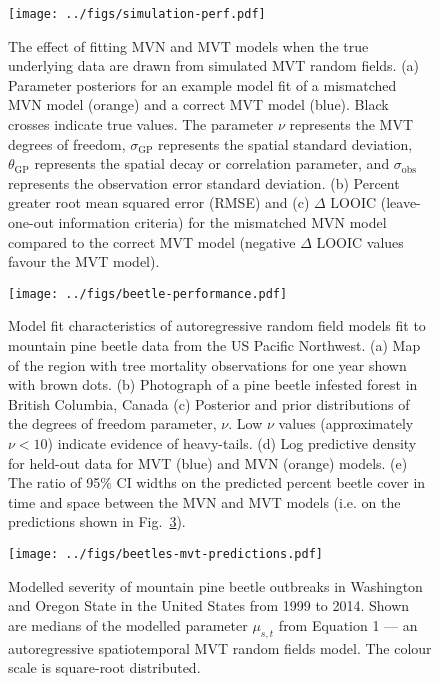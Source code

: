 \documentclass[12pt,english]{article}
\begin{document}
\begin{spacing}{1.8}
\begin{figure}[htb]
  \begin{center}
    \texttt{[image: ../figs/simulation-perf.pdf]}
    \caption{
      The effect of fitting MVN and MVT models
      when the true underlying data are drawn from simulated MVT random fields.
      (a) Parameter posteriors for an
      example model fit of a mismatched MVN model (orange)
      and a correct MVT model (blue). Black crosses indicate true values.
      The parameter $\nu$ represents the MVT degrees of freedom,
      $\sigma_{\mathrm{GP}}$ represents the spatial standard deviation,
      $\theta_{\mathrm{GP}}$ represents the spatial decay or correlation parameter,
      and $\sigma_\mathrm{obs}$ represents the observation error standard deviation.
      (b) Percent greater root mean squared error (RMSE)
      and (c) $\Delta$ LOOIC (leave-one-out information criteria)
      for the mismatched MVN model compared to the correct MVT model (negative
      $\Delta$ LOOIC values favour the MVT model).
    }
    \label{fig:sim-performance}
  \end{center}
\end{figure}

\begin{figure}[htb]
  \begin{center}
    \texttt{[image: ../figs/beetle-performance.pdf]}
    \caption{
      Model fit characteristics of autoregressive random field
      models fit to mountain pine beetle data from the US Pacific Northwest.
      (a) Map of the region with tree mortality observations for one year shown with
      brown dots.
      (b) Photograph of a pine beetle infested forest in British Columbia, Canada
      (c) Posterior and prior distributions of the degrees of freedom parameter, $\nu$.
      Low $\nu$ values (approximately $\nu < 10$) indicate evidence of heavy-tails.
      (d) Log predictive density for held-out data for MVT (blue) and MVN (orange) models.
      (e) The ratio of 95\% CI widths on the predicted percent beetle cover in
      time and space between the MVN and MVT models (i.e. on the predictions
      shown in Fig.~\ref{fig:beetle-pred}).
    }
    \label{fig:map-etc}
  \end{center}
\end{figure}

\clearpage

\begin{figure}[htb]
  \begin{center}
    \texttt{[image: ../figs/beetles-mvt-predictions.pdf]}
    \caption{Modelled severity of mountain pine beetle outbreaks in Washington and
      Oregon State in the United States from 1999 to 2014.
      Shown are medians of the modelled parameter $\mu_{s,t}$ from Equation 1
      --- an autoregressive spatiotemporal MVT random fields model.
      The colour scale is square-root distributed.
    }
    \label{fig:beetle-pred}
  \end{center}
\end{figure}


\end{spacing}
\end{document}
